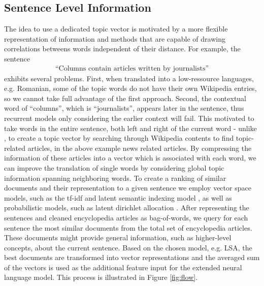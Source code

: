 \documentclass[a4paper]{article}
\begin{document}
\subsection{Sentence Level Information} \label{sec:sentence-level}
The idea to use a dedicated topic vector is motivated by a more flexible representation of information and methods that are capable of drawing correlations betweens words independent of their distance.
For example, the sentence 
\begin{align}
\text{``Columns contain articles written by journalists''}
\end{align}
exhibits several problems. First, when translated into a low-ressource languages, e.g. Romanian, some of the topic words do not have their own Wikipedia entries, so we cannot take full advantage of the first approach. Second, the contextual word of ``columns'', which is ``journalists'', appears later in the sentence, thus recurrent models only considering the earlier context will fail. 
This motivated to take words in the entire sentence, both left and right of the current word -  unlike \cite{mikolov2012context}, to create a topic vector by searching through Wikipedia contents to find topic-related articles, in the above example news related articles. By compressing the information of these articles into a vector which is associated with each word, we can improve the translation of single words by considering global topic information spanning neighboring words. 
To create a ranking of similar documents and their representation to a given sentence we employ vector space models, such as the tf-idf \cite{salton1986introduction} and latent semantic indexing model \cite{bradford2008empirical}, as well as probabilistic models, such as latent dirichlet allocation \cite{blei2003latent}. After representing the sentences and cleaned encyclopedia articles as bag-of-words, we query for each sentence the most similar documents from the total set of encyclopedia articles. These documents might provide general information, such as higher-level concepts, about the current sentence. Based on the chosen model, e.g. LSA, the best documents are transformed into vector representations and the averaged sum of the vectors is used as the additional feature input for the extended neural language model. This process is illustrated in Figure \ref{fig:flow}.
\end{document}

